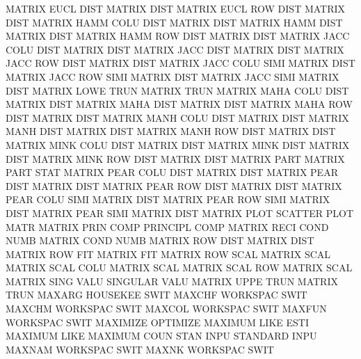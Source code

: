 MATRIX   EUCL DIST                      MATRIX   DIST
MATRIX   EUCL ROW  DIST                 MATRIX   DIST
MATRIX   HAMM COLU DIST                 MATRIX   DIST
MATRIX   HAMM DIST                      MATRIX   DIST
MATRIX   HAMM ROW  DIST                 MATRIX   DIST
MATRIX   JACC COLU DIST                 MATRIX   DIST
MATRIX   JACC DIST                      MATRIX   DIST
MATRIX   JACC ROW  DIST                 MATRIX   DIST
MATRIX   JACC COLU SIMI                 MATRIX   DIST
MATRIX   JACC ROW  SIMI                 MATRIX   DIST
MATRIX   JACC SIMI                      MATRIX   DIST
MATRIX   LOWE TRUN                      MATRIX   TRUN
MATRIX   MAHA COLU DIST                 MATRIX   DIST
MATRIX   MAHA DIST                      MATRIX   DIST
MATRIX   MAHA ROW  DIST                 MATRIX   DIST
MATRIX   MANH COLU DIST                 MATRIX   DIST
MATRIX   MANH DIST                      MATRIX   DIST
MATRIX   MANH ROW  DIST                 MATRIX   DIST
MATRIX   MINK COLU DIST                 MATRIX   DIST
MATRIX   MINK DIST                      MATRIX   DIST
MATRIX   MINK ROW  DIST                 MATRIX   DIST
MATRIX   PART                           MATRIX   PART STAT
MATRIX   PEAR COLU DIST                 MATRIX   DIST
MATRIX   PEAR DIST                      MATRIX   DIST
MATRIX   PEAR ROW  DIST                 MATRIX   DIST
MATRIX   PEAR COLU SIMI                 MATRIX   DIST
MATRIX   PEAR ROW  SIMI                 MATRIX   DIST
MATRIX   PEAR SIMI                      MATRIX   DIST
MATRIX   PLOT                           SCATTER  PLOT MATR
MATRIX   PRIN COMP                      PRINCIPL COMP
MATRIX   RECI COND NUMB                 MATRIX   COND NUMB
MATRIX   ROW  DIST                      MATRIX   DIST
MATRIX   ROW  FIT                       MATRIX   FIT
MATRIX   ROW  SCAL                      MATRIX   SCAL
MATRIX   SCAL COLU                      MATRIX   SCAL
MATRIX   SCAL ROW                       MATRIX   SCAL
MATRIX   SING VALU                      SINGULAR VALU
MATRIX   UPPE TRUN                      MATRIX   TRUN
MAXARG                                  HOUSEKEE SWIT
MAXCHF                                  WORKSPAC SWIT
MAXCHM                                  WORKSPAC SWIT
MAXCOL                                  WORKSPAC SWIT
MAXFUN                                  WORKSPAC SWIT
MAXIMIZE                                OPTIMIZE
MAXIMUM  LIKE ESTI                      MAXIMUM  LIKE
MAXIMUM  COUN STAN INPU                 STANDARD INPU
MAXNAM                                  WORKSPAC SWIT
MAXNK                                   WORKSPAC SWIT
